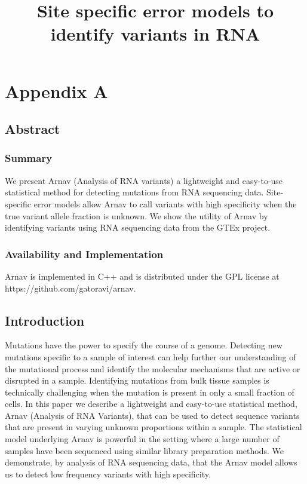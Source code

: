 
\chapter{Appendix A}
\label{chap:appendix A}

\title{Site specific error models to identify variants in RNA}

\section{Abstract}

\subsection{Summary}
We present Arnav (Analysis of RNA variants) a lightweight and easy-to-use statistical method for detecting mutations from RNA sequencing data. Site-specific error models allow Arnav to call variants with high specificity when the true variant allele fraction is unknown. We show the utility of Arnav by identifying variants using RNA sequencing data from the GTEx project.

\subsection{Availability and Implementation} 
Arnav is implemented in C++ and is distributed under the GPL license at https://github.com/gatoravi/arnav.

\section{Introduction}
Mutations have the power to specify the course of a genome. Detecting new mutations specific to a sample of interest can help further our understanding of the mutational process and identify the molecular mechanisms that are active or disrupted in a sample. Identifying mutations from bulk tissue samples is technically challenging when the mutation is present in only a small fraction of cells. In this paper we describe a lightweight and easy-to-use statistical method, Arnav (Analysis of RNA Variants), that can be used to detect sequence variants that are present in varying unknown proportions within a sample. The statistical model underlying Arnav is powerful in the setting where a large number of samples have been sequenced using similar library preparation methods. We demonstrate, by analysis of RNA sequencing data, that the Arnav model allows us to detect low frequency variants with high specificity.


